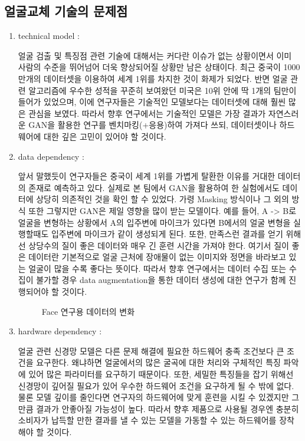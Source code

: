 \documentclass{oblivoir}
\begin{document}
\subsection{얼굴교체 기술의 문제점}
\begin{enumerate}
    \item technical model : 

    얼굴 검출 및 특징점 관련 기술에 대해서는 커다란 이슈가 없는 상황이면서 이미 사람의 수준을 뛰어넘어 더욱 향상되어질 상황만 남은 상태이다. 최근 중국이 1000만개의 데이터셋을 이용하여 세계 1위를 차지한 것이 화제가 되었다. 반면 얼굴 관련 알고리즘에 우수한 성적을 꾸준히 보여왔던 미국은 10위 안에 딱 1개의 팀만이 들어가 있었으며, 이에 연구자들은 기술적인 모델보다는 데이터셋에 대해 훨씬 많은 관심을 보였다. 따라서 향후 연구에서는 기술적인 모델은 가장 결과가 자연스러운 GAN을 활용한 연구를 벤치마킹(+응용)하여 가져다 쓰되, 데이터셋이나 하드웨어에 대한 깊은 고민이 있어야 할 것이다.

    \item data dependency : 

    앞서 말했듯이 연구자들은 중국이 세계 1위를 가볍게 탈환한 이유를 거대한 데이터의 존재로 예측하고 있다. 실제로 본 팀에서 GAN을 활용하여 한 실험에서도 데이터에 상당히 의존적인 것을 확인 할 수 있었다. 가령 Masking 방식이나 그 외의 방식 또한 그렇지만 GAN은 제일 영향을 많이 받는 모델이다. 예를 들어, A -> B로 얼굴을 변형하는 상황에서 A의 입주변에 마이크가 있다면 B에서의 얼굴 변형을 실행할때도 입주변에 마이크가 같이 생성되게 된다. 또한, 만족스런 결과를 얻기 위해선 상당수의 질이 좋은 데이터와 매우 긴 훈련 시간을 가져야 한다. 여기서 질이 좋은 데이터란 기본적으로 얼굴 근처에 장애물이 없는 이미지와 정면을 바라보고 있는 얼굴이 많을 수록 좋다는 뜻이다. 따라서 향후 연구에서는 데이터 수집 또는 수집이 불가할 경우 data augmentation을 통한 데이터 생성에 대한 연구가 함께 진행되어야 할 것이다.

    \begin{figure}[h!]
        \centering
    \caption{Face 연구용 데이터의 변화 \cite{reference6}}
    \end{figure}

    \item hardware dependency : 

    얼굴 관련 신경망 모델은 다른 문제 해결에 필요한 하드웨어 충족 조건보다 큰 조건을 요구한다. 왜냐하면 얼굴에서의 많은 굴곡에 대한 처리와 구체적인 특징 파악에 있어 많은 파라미터를 요구하기 때문이다. 또한, 세밀한 특징들을 잡기 위해선 신경망이 깊어질 필요가 있어 우수한 하드웨어 조건을 요구하게 될 수 밖에 없다. 물론 모델 깊이를 줄인다면 연구자의 하드웨어에 맞게 훈련을 시킬 수 있겠지만 그만큼 결과가 안좋아질 가능성이 높다. 따라서 향후 제품으로 사용될 경우엔 충분히 소비자가 납득할 만한 결과를 낼 수 있는 모델을 가동할 수 있는 하드웨어를 장착해야 할 것이다. 


\end{enumerate}
\end{document}
